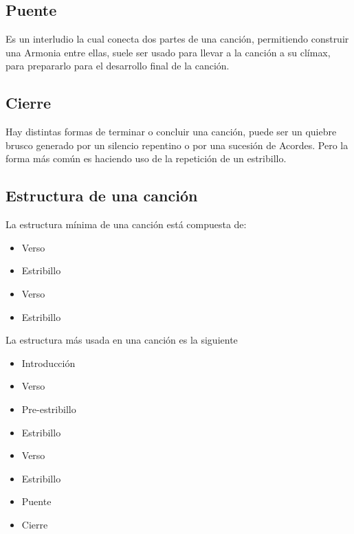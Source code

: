 \documentclass[12pt, a4paper, titlepage]{report}
\begin{document}
			\subsection{Puente}
			Es un interludio la cual conecta dos partes de una canción, permitiendo construir una \Gls{Armonia}  entre ellas, suele ser usado para llevar a la canción a su clímax, para prepararlo para el desarrollo final de la canción.\par
			\subsection{Cierre}
			Hay distintas formas de terminar o concluir una canción, puede ser un quiebre brusco generado por un silencio repentino o por una sucesión de \Gls{Acordes}. Pero la forma más común es haciendo uso de la repetición de un estribillo.\par
			\subsection{Estructura de una canción}
			La estructura mínima de una canción está compuesta de:\par
			\begin{itemize}
			  \item Verso
			  \item Estribillo
			  \item Verso
			  \item Estribillo
			\end{itemize}
			La estructura más usada en una canción es la siguiente
			\begin{itemize}
			  \item Introducción
			  \item Verso
			  \item Pre-estribillo
			  \item Estribillo
			  \item Verso
			  \item Estribillo
			  \item Puente
			  \item Cierre
			\end{itemize}
\end{document}

